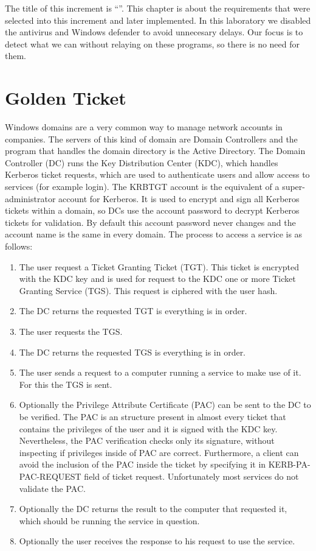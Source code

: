 \newcommand{\RNO}{\cellcolor{red!60}No}
\newcommand{\RYES}{\cellcolor{green!60}Yes}
The title of this increment is ``\IncrementoUno''. This chapter is about the requirements that were selected into this increment and later implemented.
\linej
In this laboratory we disabled the antivirus and Windows defender to avoid unnecesary delays. Our focus is to detect what we can without relaying on these programs, so there is no need for them.

\section{Golden Ticket}
Windows domains are a very common way to manage network accounts in companies. The servers of this kind of domain are Domain Controllers and the program that handles the domain directory is the Active Directory. The Domain Controller (DC) runs the Key Distribution Center (KDC), which handles Kerberos ticket requests, which are used to authenticate users and allow access to services (for example login).
\linej
The KRBTGT account is the equivalent of a super-administrator account for Kerberos. It is used to encrypt and sign all Kerberos tickets within a domain, so DCs use the account password to decrypt Kerberos tickets for validation.
By default this account password never changes and the account name is the same in every domain\cite{stealthbits}.
\linej
\linej
The process to access a service is as follows\cite{tarlogic_theory}\cite{tarlogic_comprehension}\cite{events_1}:
\begin{enumerate}
	\item The user request a Ticket Granting Ticket (TGT). This ticket is encrypted with the KDC key and is used for request to the KDC one or more Ticket Granting Service (TGS). This request is ciphered with the user hash.
	\item The DC returns the requested TGT is everything is in order.
	\item The user requests the TGS.
	\item The DC returns the requested TGS is everything is in order.
	\item The user sends a request to a computer running a service to make use of it. For this the TGS is sent.
	\item Optionally the Privilege Attribute Certificate (PAC) can be sent to the DC to be verified. The PAC is an structure present in almost every ticket that contains the privileges of the user and it is signed with the KDC key. Nevertheless, the PAC verification checks only its signature, without inspecting if privileges inside of PAC are correct. Furthermore, a client can avoid the inclusion of the PAC inside the ticket by specifying it in KERB-PA-PAC-REQUEST field of ticket request. Unfortunately most services do not validate the PAC.
	\item Optionally the DC returns the result to the computer that requested it, which should be running the service in question.
	\item Optionally the user receives the response to his request to use the service.
\end{enumerate}

